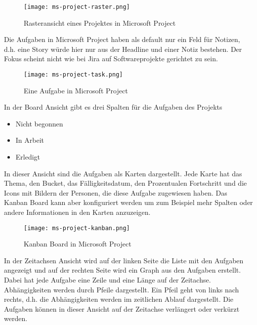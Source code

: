 \begin{figure}[H]
	\centering
	\texttt{[image: ms-project-raster.png]}
    \caption{Rasteransicht eines Projektes in Microsoft Project}
	\label{fig:rastermsproject}
\end{figure}

Die Aufgaben in Microsoft Project haben als default nur ein Feld für Notizen, d.h. eine Story würde hier nur aus der Headline und einer Notiz bestehen. Der Fokus scheint nicht wie bei Jira auf Softwareprojekte gerichtet zu sein.  

\begin{figure}[H]
	\centering
	\texttt{[image: ms-project-task.png]}
    \caption{Eine Aufgabe in Microsoft Project}
	\label{fig:taskmsproject}
\end{figure}

In der Board Ansicht gibt es drei Spalten für die Aufgaben des Projekts\\
\begin{itemize}
    \item Nicht begonnen 
    \item In Arbeit  
    \item Erledigt
\end{itemize}
In dieser Ansicht sind die Aufgaben als Karten dargestellt. Jede Karte hat das Thema, den Bucket, das Fälligkeitsdatum, den Prozentualen Fortschritt und die Icons mit Bildern der Personen, die diese Aufgabe zugewiesen haben. Das Kanban Board kann aber konfiguriert werden um zum Beispiel mehr Spalten oder andere Informationen in den Karten anzuzeigen.\\

\begin{figure}[H]
	\centering
	\texttt{[image: ms-project-kanban.png]}
    \caption{Kanban Board in Microsoft Project}
	\label{fig:kanbanmsproject}
\end{figure}

In der Zeitachsen Ansicht wird auf der linken Seite die Liste mit den Aufgaben angezeigt und auf der rechten Seite wird ein Graph aus den Aufgaben erstellt. Dabei hat jede Aufgabe eine Zeile und eine Länge auf der Zeitachse.\\
Abhängigkeiten werden durch Pfeile dargestellt. Ein Pfeil geht von links nach rechts, d.h. die Abhängigkeiten werden im zeitlichen Ablauf dargestellt. Die Aufgaben können in dieser Ansicht auf der Zeitachse verlängert oder verkürzt werden.\\


